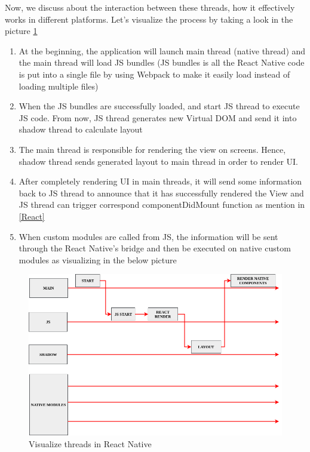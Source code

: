 Now, we discuss about the interaction between these threads, how it effectively works in different platforms. Let's visualize the process by taking a look in the picture \ref{fig:RN-threads-visualization}

\begin{enumerate}
\item At the beginning, the application will launch main thread (native thread) and the main thread will load JS bundles (JS bundles is all the React Native code is put into a single file by using Webpack to make it easily load instead of loading multiple files) 
\item When the JS bundles are successfully loaded, and start JS thread to execute JS code. From now, JS thread generates new Virtual DOM and send it into shadow thread to calculate layout
\item The main thread is responsible for rendering the view on screens. Hence, shadow thread sends generated layout to main thread in order to render UI.
\item After completely rendering UI in main threads, it will send some information back to JS thread to announce that it has successfully rendered the View and JS thread can trigger correspond componentDidMount function as mention in \ref{React}
\item When custom modules are called from JS, the information will be sent through the React Native's bridge and then be executed on native custom modules as visualizing in the below picture
\end{enumerate}

\begin{figure}[!h]
   	\centering
    	\includegraphics[scale=0.4]{Picture/mobile/RN-threads.png}
    	\caption{Visualize threads in React Native}
	\label{fig:RN-threads-visualization}
\end{figure}

